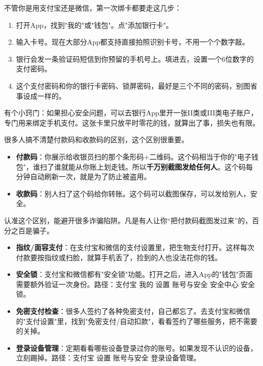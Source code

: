 


不管你是用支付宝还是微信，第一次绑卡都要走这几步：

\begin{enumerate}
  \item 打开App，找到"我的"或"钱包"。点"添加银行卡"。
  \item 输入卡号。现在大部分App都支持直接拍照识别卡号，不用一个个数字敲。
  \item 银行会发一条验证码短信到你预留的手机号上。填进去，设置一个6位数字的支付密码。
  \item 这个支付密码和你的银行卡密码、锁屏密码，最好是三个不同的密码，别图省事设成一样的。
\end{enumerate}

有个小窍门：如果担心安全问题，可以去银行App里开一张II类或III类电子账户，专门用来绑定手机支付。这张卡里只放平时零花的钱，就算出了事，损失也有限。


很多人搞不清楚付款码和收款码的区别，这个区别很重要。

\begin{itemize}
  \item \textbf{付款码}：你展示给收银员扫的那个条形码+二维码。这个码相当于你的"电子钱包"，谁扫了谁就能从你账上划走钱。所以\textbf{千万别截图发给任何人}。这个码每分钟自动刷新一次，就是为了防止被盗用。
  \item \textbf{收款码}：别人扫了这个码给你转账。这个码可以截图保存，可以发给别人，安全。
\end{itemize}

认准这个区别，能避开很多诈骗陷阱。凡是有人让你“把付款码截图发过来”的，百分之百是骗子。


\begin{itemize}
  \item \textbf{指纹/面容支付}：在支付宝和微信的支付设置里，把生物支付打开。这样每次付款要按指纹或扫脸，就算手机丢了，捡到的人也没法花你的钱。
  \item \textbf{安全锁}：支付宝和微信都有"安全锁"功能。打开之后，进入App的"钱包"页面需要额外验证一次身份。路径：支付宝 我的 设置 账号与安全 安全中心 安全锁。
  \item \textbf{免密支付检查}：很多人签约了各种免密支付，自己都忘了。去支付宝和微信的"支付设置"里，找到"免密支付/自动扣款"，看看签约了哪些服务，把不需要的关掉。
  \item \textbf{登录设备管理}：定期看看哪些设备登录过你的账号。如果发现不认识的设备，立刻踢掉。路径：支付宝 设置 账号与安全 登录设备管理。
\end{itemize}

